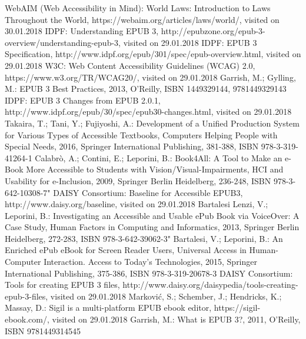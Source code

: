 \documentclass{llncs}
\begin{document}
\begin{thebibliography}{}
%
 WebAIM (Web Accessibility in Mind): World Laws: Introduction to Laws Throughout the World, https://webaim.org/articles/laws/world/, visited on 30.01.2018
 IDPF: Understanding EPUB 3, http://epubzone.org/epub-3-overview/understanding-epub-3, visited on 29.01.2018
 IDPF: EPUB 3 Specification, http://www.idpf.org/epub/301/spec/epub-overview.html, visited on 29.01.2018
 W3C: Web Content Accessibility Guidelines (WCAG) 2.0, https://www.w3.org/TR/WCAG20/, visited on 29.01.2018
 Garrish, M.; Gylling, M.: EPUB 3 Best Practices, 2013, O'Reilly, ISBN 1449329144, 9781449329143
 IDPF: EPUB 3 Changes from EPUB 2.0.1, http://www.idpf.org/epub/30/spec/epub30-changes.html, visited on 29.01.2018
 Takaira, T.; Tani, Y.; Fujiyoshi, A.: Development of a Unified Production System for Various Types of Accessible Textbooks, Computers Helping People with Special Needs, 2016, Springer International Publishing, 381-388, ISBN 978-3-319-41264-1
 Calabr{\`o}, A.; Contini, E.; Leporini, B.: Book4All: A Tool to Make an e-Book More Accessible to Students with Vision/Visual-Impairments, HCI and Usability for e-Inclusion, 2009, Springer Berlin Heidelberg, 236-248, ISBN 978-3-642-10308-7"
 DAISY Consortium: Baseline for Accessible EPUB3, http://www.daisy.org/baseline, visited on 29.01.2018
 Bartalesi Lenzi, V.; Leporini, B.: Investigating an Accessible and Usable ePub Book via VoiceOver: A Case Study, Human Factors in Computing and Informatics, 2013, Springer Berlin Heidelberg, 272-283, ISBN 978-3-642-39062-3"
 Bartalesi, V.; Leporini, B.: An Enriched ePub eBook for Screen Reader Users, Universal Access in Human-Computer Interaction. Access to Today's Technologies, 2015, Springer International Publishing, 375-386, ISBN 978-3-319-20678-3
 DAISY Consortium: Tools for creating EPUB 3 files, http://www.daisy.org/daisypedia/tools-creating-epub-3-files, visited on 29.01.2018
 Marković, S.; Schember, J.; Hendricks, K.; Massay, D.: Sigil is a multi-platform EPUB ebook editor, https://sigil-ebook.com/, visited on 29.01.2018
 Garrish, M.: What is EPUB 3?, 2011, O'Reilly, ISBN 9781449314545

\end{thebibliography}
\end{document}
